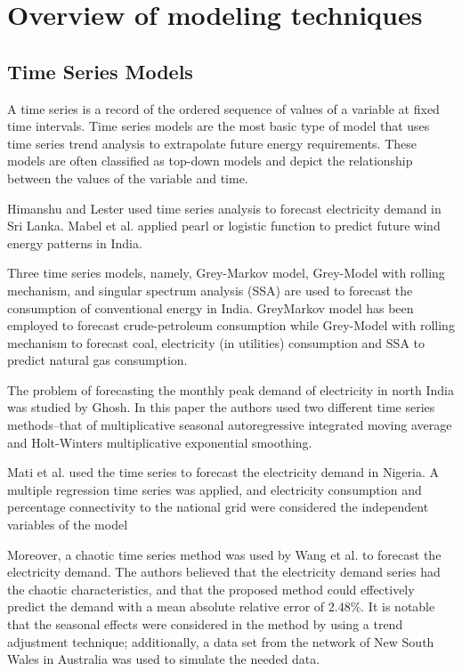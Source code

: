 \documentclass[lettersize,journal]{IEEEtran}
\begin{document}
\section{Overview of modeling techniques}

  \subsection{Time Series Models}

  A time series is a record of the ordered sequence of values of a variable at fixed time intervals. Time series models are the most basic type of model that uses time series trend analysis to extrapolate future energy requirements. These models are often classified as top-down models and depict the relationship between the values of the variable and time.

  Himanshu and Lester used time series analysis to forecast electricity demand in Sri Lanka\cite{srilanka}. Mabel et al. applied pearl or logistic function to predict future wind energy patterns in India\cite{TSA-india}.

Three time series models, namely, Grey-Markov model, Grey-Model with rolling mechanism, and singular spectrum analysis (SSA) are used to forecast the consumption of conventional energy in India. GreyMarkov model has been employed to forecast crude-petroleum consumption while Grey-Model with rolling mechanism to forecast coal, electricity (in utilities) consumption and SSA to predict natural gas consumption\cite{time-serie india}.

The problem of forecasting the monthly peak demand of electricity in north India was studied by Ghosh\cite{time-serie india ghosh}. In this paper the authors used two different time series methods–that of multiplicative seasonal autoregressive integrated moving average and Holt-Winters multiplicative exponential smoothing. 

Mati et al.\cite{time-serie Nigeria} used the time series to forecast the electricity demand in Nigeria. A multiple regression time series was applied, and electricity consumption and percentage connectivity to the national grid were considered the independent variables of the model

Moreover, a chaotic time series method was used by Wang et al.\cite{time-serie china} to forecast the electricity demand. The authors believed that the electricity demand series had the chaotic characteristics, and that the proposed method could effectively predict the demand with a mean absolute relative error of 2.48\%. It is notable that the seasonal effects were considered in the method by using a trend adjustment technique; additionally, a data set from the network of New South Wales in Australia was used to simulate the needed data.
\end{document}
